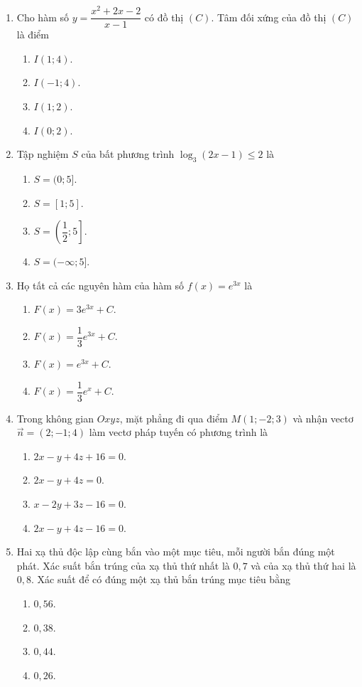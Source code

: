\documentclass[12pt,a4paper]{article}
\begin{document}
\begin{enumerate}[label=\textbf{Câu \arabic*:}, leftmargin=*]

\item Cho hàm số $y = \dfrac{x^2 + 2x - 2}{x - 1}$ có đồ thị $(C)$. Tâm đối xứng của đồ thị $(C)$ là điểm
\begin{enumerate}[label=\Alph*.]
    \item $I(1; 4)$.
    \item $I(-1; 4)$.
    \item $I(1; 2)$.
    \item $I(0; 2)$.
\end{enumerate}

\item Tập nghiệm $S$ của bất phương trình $\log_3(2x - 1) \le 2$ là
\begin{enumerate}[label=\Alph*.]
    \item $S = (0; 5]$.
    \item $S = [1; 5]$.
    \item $S = \left(\dfrac{1}{2}; 5\right]$.
    \item $S = (-\infty; 5]$.
\end{enumerate}

\item Họ tất cả các nguyên hàm của hàm số $f(x) = e^{3x}$ là
\begin{enumerate}[label=\Alph*.]
    \item $F(x) = 3e^{3x} + C$.
    \item $F(x) = \dfrac{1}{3}e^{3x} + C$.
    \item $F(x) = e^{3x} + C$.
    \item $F(x) = \dfrac{1}{3}e^x + C$.
\end{enumerate}

\item Trong không gian $Oxyz$, mặt phẳng đi qua điểm $M(1; -2; 3)$ và nhận vectơ $\vec{n} = (2; -1; 4)$ làm vectơ pháp tuyến có phương trình là
\begin{enumerate}[label=\Alph*.]
    \item $2x - y + 4z + 16 = 0$.
    \item $2x - y + 4z = 0$.
    \item $x - 2y + 3z - 16 = 0$.
    \item $2x - y + 4z - 16 = 0$.
\end{enumerate}

\item Hai xạ thủ độc lập cùng bắn vào một mục tiêu, mỗi người bắn đúng một phát. Xác suất bắn trúng của xạ thủ thứ nhất là $0{,}7$ và của xạ thủ thứ hai là $0{,}8$. Xác suất để có đúng một xạ thủ bắn trúng mục tiêu bằng
\begin{enumerate}[label=\Alph*.]
    \item $0{,}56$.
    \item $0{,}38$.
    \item $0{,}44$.
    \item $0{,}26$.
\end{enumerate}


\end{enumerate}
\end{document}
